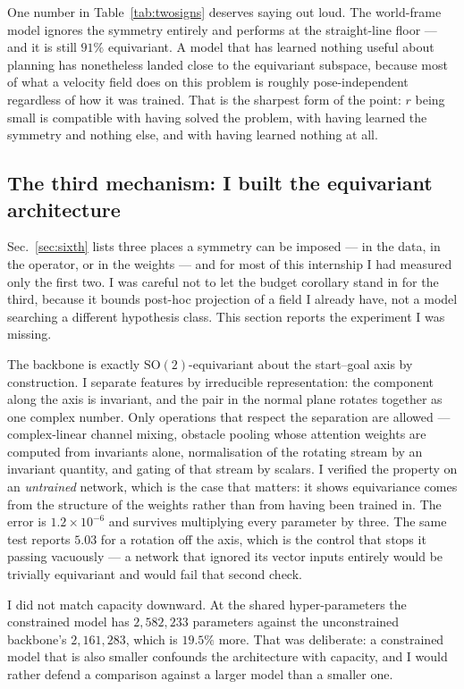 \documentclass[11pt,a4paper]{article}
\begin{document}
One number in Table~\ref{tab:twosigns} deserves saying out loud. The world-frame
model ignores the symmetry entirely and performs at the straight-line floor --- and
it is still $91\%$ equivariant. A model that has learned nothing useful about
planning has nonetheless landed close to the equivariant subspace, because most of
what a velocity field does on this problem is roughly pose-independent regardless
of how it was trained. That is the sharpest form of the point: $r$ being small is
compatible with having solved the problem, with having learned the symmetry and
nothing else, and with having learned nothing at all.

\subsection{The third mechanism: I built the equivariant architecture}
\label{sec:arch}

Sec.~\ref{sec:sixth} lists three places a symmetry can be imposed --- in the
data, in the operator, or in the weights --- and for most of this internship I
had measured only the first two. I was careful not to let the budget corollary
stand in for the third, because it bounds post-hoc projection of a field I
already have, not a model searching a different hypothesis class. This section
reports the experiment I was missing.

The backbone is exactly $\mathrm{SO}(2)$-equivariant about the start--goal axis
by construction. I separate features by irreducible representation: the
component along the axis is invariant, and the pair in the normal plane rotates
together as one complex number. Only operations that respect the separation are
allowed --- complex-linear channel mixing, obstacle pooling whose attention
weights are computed from invariants alone, normalisation of the rotating stream
by an invariant quantity, and gating of that stream by scalars. I verified the
property on an \emph{untrained} network, which is the case that matters: it
shows equivariance comes from the structure of the weights rather than from
having been trained in. The error is $1.2\times10^{-6}$ and survives multiplying
every parameter by three. The same test reports $5.03$ for a rotation off the
axis, which is the control that stops it passing vacuously --- a network that
ignored its vector inputs entirely would be trivially equivariant and would fail
that second check.

I did not match capacity downward. At the shared hyper-parameters the
constrained model has $2{,}582{,}233$ parameters against the unconstrained
backbone's $2{,}161{,}283$, which is $19.5\%$ more. That was deliberate: a
constrained model that is also smaller confounds the architecture with capacity,
and I would rather defend a comparison against a larger model than a smaller one.
\end{document}
